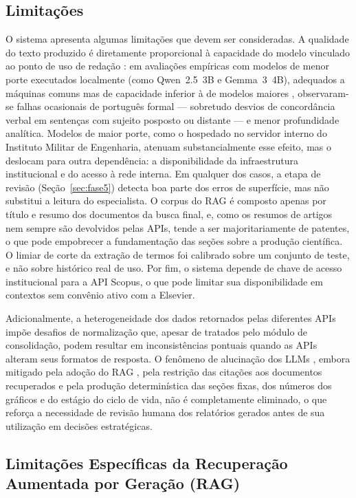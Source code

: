 \documentclass[12pt, a4paper]{article}
\begin{document}
  \subsection{Limitações}
  \label{sec:limitacoes}

  O sistema apresenta algumas limitações que devem ser consideradas. A
qualidade do texto produzido é diretamente proporcional à capacidade do modelo
vinculado ao ponto de uso de redação \cite{zhao2023}: em avaliações empíricas com modelos de menor
porte executados localmente (como Qwen~2.5~3B e Gemma~3~4B), adequados a
máquinas comuns mas de capacidade inferior à de modelos maiores
\cite{brown2020}, observaram-se falhas ocasionais de português formal ---
sobretudo desvios de concordância verbal em sentenças com sujeito posposto ou distante --- e menor profundidade
analítica. Modelos de maior porte, como o hospedado no servidor interno do
Instituto Militar de Engenharia, atenuam substancialmente esse efeito, mas o
deslocam para outra dependência: a disponibilidade da infraestrutura
institucional e do acesso à rede interna. Em qualquer dos casos, a etapa de
revisão (Seção~\ref{sec:fase5}) detecta boa parte dos erros de superfície, mas
não substitui a leitura do especialista. O corpus do RAG é
composto apenas por título e resumo dos documentos da busca final, e, como os
resumos de artigos nem sempre são devolvidos pelas APIs, tende a ser
majoritariamente de patentes, o que pode empobrecer a fundamentação das seções
sobre a produção científica. O limiar de corte da extração de termos foi
calibrado sobre um conjunto de teste, e não sobre histórico real de uso. Por
fim, o sistema depende de chave de acesso institucional para a API Scopus, o
que pode limitar sua disponibilidade em contextos sem convênio ativo com a
Elsevier.

  Adicionalmente, a heterogeneidade dos dados retornados pelas diferentes APIs
impõe desafios de normalização que, apesar de tratados pelo módulo de
consolidação, podem resultar em inconsistências pontuais quando as
APIs alteram seus formatos de resposta. O fenômeno de alucinação dos LLMs
\cite{ji2022}, embora mitigado pela adoção do RAG \cite{lewis2020}, pela
restrição das citações aos documentos recuperados e pela produção
determinística das seções fixas, dos números dos gráficos e do estágio do
ciclo de vida, não é completamente eliminado, o que reforça a necessidade de
revisão humana dos relatórios gerados antes de sua utilização em decisões
estratégicas.

  \subsection{Limitações Específicas da Recuperação Aumentada por Geração (RAG)}
\end{document}
